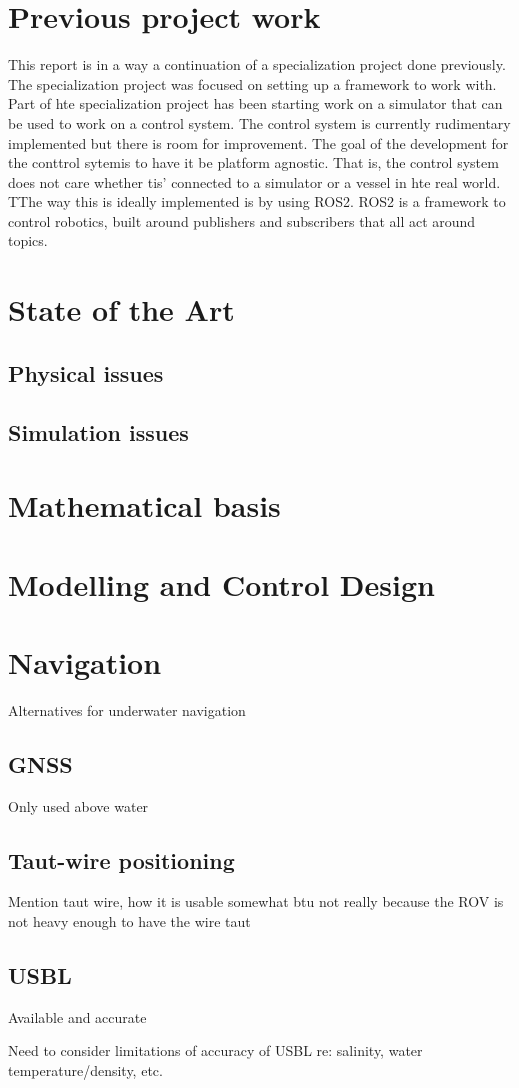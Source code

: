 \documentclass[class=article, crop=false, draft=true]{standalone}
\begin{document}
\section{Previous project work}
This report is in a way a continuation of a specialization project\cite{specialization} done previously. The specialization project was focused on setting up a framework to work with. Part of hte specialization project has been starting work on a simulator that can be used to work on a control system. The control system is currently rudimentary implemented but there is room for improvement. The goal of the development for the conttrol sytemis to have it be platform agnostic. That is, the control system does not care whether tis' connected to a simulator or a vessel in hte real world. TThe way this is ideally implemented is by using ROS2. ROS2 is a framework to control robotics, built around publishers and subscribers that all act around topics.



\section{State of the Art}
\subsection{Physical issues}
\subsection{Simulation issues}

\section{Mathematical basis}

\section{Modelling and Control Design}

\section{Navigation}
Alternatives for underwater navigation
\subsection{GNSS}
Only used above water
\subsection{Taut-wire positioning}
Mention taut wire, how it is usable somewhat btu not really because the ROV is not heavy enough to have the wire taut
\subsection{USBL}
Available and accurate

Need to consider limitations of accuracy of USBL re: salinity, water temperature/density, etc.
\end{document}
